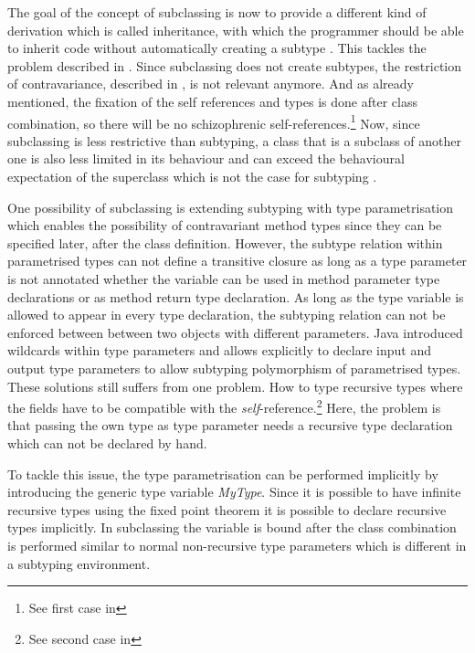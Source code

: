 The goal of the concept of subclassing is now to provide a different kind
of derivation which is called inheritance, with which the programmer
should be able to inherit code without automatically creating a subtype
\cite{simons_theory_2002-2}. This tackles the problem described in
. Since subclassing does not create subtypes, the
restriction of contravariance, described in ,
is not relevant anymore. And as already mentioned, the fixation of the
self references and types is done after class combination, so there
will be no schizophrenic self-references.\footnote{See first case in
} Now, since subclassing is less restrictive
than subtyping, a class that is a subclass of another one
is also less limited in its behaviour and
can exceed the behavioural expectation of the superclass which is not
the case for subtyping \cite{simons_theory_2002-2}.

One possibility of subclassing is extending subtyping with type
parametrisation which enables the possibility of contravariant
method types since they can be specified later, after the class
definition. However, the subtype relation within parametrised types
can not define a transitive closure as long as a type parameter is not
annotated whether the variable can be used in method parameter type
declarations or as method return type declaration. As long as the type
variable is allowed to appear in every type declaration, the subtyping
relation can not be enforced between between two objects with different
parameters. Java introduced wildcards within type parameters and \cs
allows explicitly to declare input and output type parameters to allow
subtyping polymorphism of parametrised types. These solutions still
suffers from one problem. How to type recursive types where the fields
have to be compatible with the \emph{self}-reference.\footnote{See second
case in } Here, the problem is that passing
the own type as type parameter needs a recursive type declaration which
can not be declared by hand.

To tackle this issue, the type parametrisation can be performed
implicitly by introducing the generic type variable \emph{MyType}. Since
it is possible to have infinite recursive types using the fixed point
theorem \cite{pierce_types_2002} it is possible to declare recursive
types implicitly. In subclassing the \mytype variable is bound after
the class combination is performed similar to normal non-recursive type
parameters which is different in a subtyping environment.

